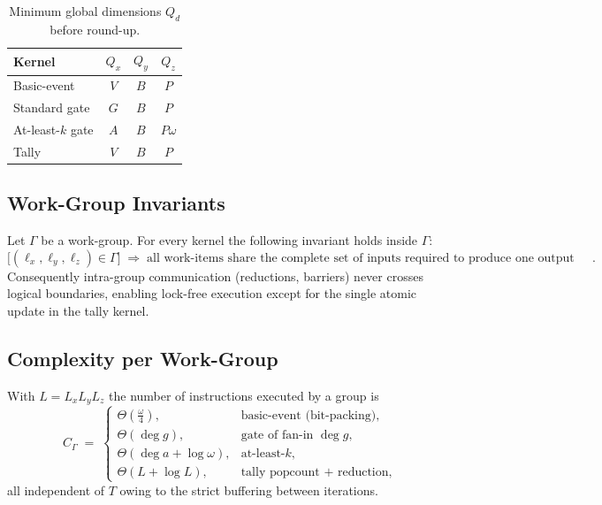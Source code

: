 \begin{table}[t]
  \centering
  \caption{Minimum global dimensions $Q_d$ before round-up.}
  \label{tab:kernel_dimensions}
  \begin{tabular}{lccc}
    \toprule
    Kernel               & $Q_x$              & $Q_y$ & $Q_z$\\
    \midrule
    Basic-event          & $V$                & $B$   & $P$\\
    Standard gate        & $G$                & $B$   & $P$\\
    At-least-$k$ gate    & $A$                & $B$   & $P\omega$\\
    Tally                & $V$                & $B$   & $P$\\
    \bottomrule
  \end{tabular}
\end{table}

\subsection{Work-Group Invariants}

Let $\Gamma$ be a work-group.  For every kernel the following invariant holds inside $\Gamma$:
\[
   \bigl[(\ell_x,\ell_y,\ell_z)\in\Gamma\bigr]
   \;\Longrightarrow\;
   \text{all work-items share the complete set of inputs required to produce one output literal}.
\]
Consequently intra-group communication (reductions, barriers) never crosses logical boundaries, enabling lock-free execution except for the single atomic update in the tally kernel.

\subsection{Complexity per Work-Group}

With $L=L_xL_yL_z$ the number of instructions executed by a group is
\[
  C_{\Gamma}
  \;=\;
  \begin{cases}
    \Theta(\frac{\omega}{4}), & \text{basic-event (bit-packing)},\\
    \Theta(\deg g), & \text{gate of fan-in }\deg g,\\
    \Theta(\deg a + \log \omega), & \text{at-least-}k,\\
    \Theta(L + \log L), & \text{tally popcount + reduction},
  \end{cases}
\]
all independent of $T$ owing to the strict buffering between iterations.

